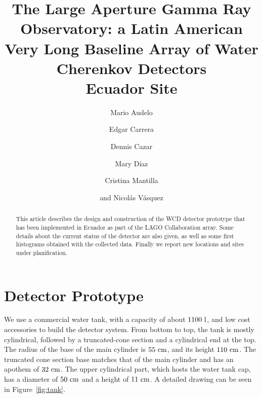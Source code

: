 \documentclass[12pt]{article}
\begin{document}
\title{The Large Aperture Gamma Ray Observatory: a Latin American Very Long
Baseline Array of Water Cherenkov Detectors\\Ecuador Site}


%
\author[2]{{ Mario Audelo}}
\author[4]{{ Edgar Carrera}}
\author[4]{{ Dennis Cazar}}
\author[3]{{ Mary D\'{i}az}}
\author[1]{{ Cristina Mantilla}}
\author[1]{{ and Nicol\'{a}s V\'{a}squez}}



\maketitle

\begin{abstract}
This article describes the design and construction of the WCD detector prototype that has been implemented in Ecuador as part of the LAGO Collaboration array. Some details about the current status of the detector are also given, as well as some first histograms obtained with the collected data. Finally we report new locations and sites under planification.
\end{abstract}

\section{Detector Prototype}

We use a commercial water tank, with a capacity of about ${1100\ {\rm l}}$, and low cost accessories to build the detector system.  From bottom to top, the tank is mostly cylindrical, followed by a truncated-cone section and a cylindrical end at the top. The radius of the base of the main cylinder is $55\ {\rm cm}$, and its height $110\ {\rm cm}$.  The truncated cone section base matches that of the main cylinder and has an apothem of $32\ {\rm cm}$. The upper cylindrical part, which hosts the water tank cap, has a diameter of $50\ {\rm cm}$ and a height of $11\ {\rm cm}$. A detailed drawing can be seen in Figure~\ref{fig:tank}.
\end{document}
